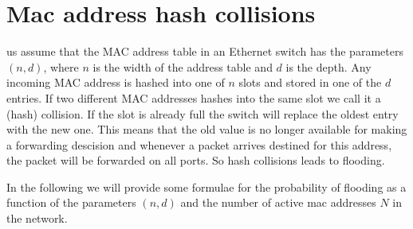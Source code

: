 \section{Mac address hash collisions}

 us assume that the MAC address table in an Ethernet switch has the parameters $(n,d)$, where $n$ is the width of the 
address table and $d$ is the depth. Any incoming MAC address is hashed into one of $n$ slots and stored
in one of the $d$ entries. If two different MAC addresses hashes into the same slot we call it a (hash) collision.
 If the slot is already full the switch will replace the oldest entry with the new one. This means that the old value is no longer 
available for making a forwarding descision and whenever a packet arrives destined for this address, the packet
will be forwarded on all ports. So hash collisions leads to flooding.

In the following we will provide some formulae for the probability of flooding as a function of the parameters $(n,d)$ and 
the number of active mac addresses $N$ in the network.

